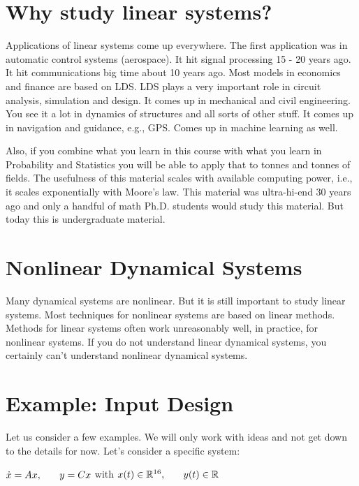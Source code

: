 \documentclass{../tufte-handout}
\begin{document}
\section{Why study linear systems?}

Applications of linear systems come up everywhere. The first application was in automatic control systems (aerospace). It hit signal processing 15 - 20 years ago. It hit communications big time about 10 years ago. Most models in economics and finance are based on LDS. LDS plays a very important role in circuit analysis, simulation and design. It comes up in mechanical and civil engineering. You see it a lot in dynamics of structures and all sorts of other stuff. It comes up in navigation and guidance, e.g., GPS. Comes up in machine learning as well. 

Also, if you combine what you learn in this course with what you learn in Probability and Statistics you will be able to apply that to tonnes and tonnes of fields. The usefulness of this material scales with available computing power, i.e., it scales exponentially with Moore's law. This material was ultra-hi-end 30 years ago and only a handful of math Ph.D. students would study this material. But today this is undergraduate material. 

\section{Nonlinear Dynamical Systems}

Many dynamical systems are nonlinear. But it is still important to study linear systems. Most techniques for nonlinear systems are based on linear methods. Methods for linear systems often work unreasonably well, in practice, for nonlinear systems. If you do not understand linear dynamical systems, you certainly can't understand nonlinear dynamical systems. 

\section{Example: Input Design}
Let us consider a few examples. We will only work with ideas and not get down to the details for now. Let's consider a specific system: \newline

\vspace{0.15in}
$\dot x = Ax, \hspace{0.25in} y = Cx$\newline
with $x(t) \in \mathbb{R}^{16}, \hspace{0.25in} y(t) \in \mathbb{R}$ 
\vspace{0.15in}
\end{document}
